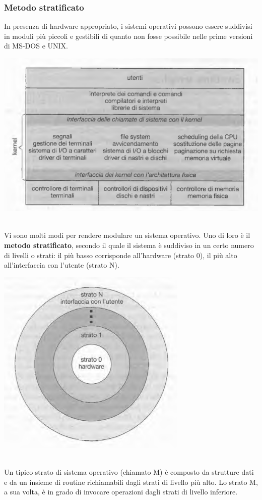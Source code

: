 \documentclass[11pt,a4paper]{article}
\begin{document}
\subsubsection{Metodo stratificato}
In presenza di hardware appropriato, i sistemi operativi possono essere suddivisi in moduli
più piccoli e gestibili di quanto non fosse possibile nelle prime versioni di MS-DOS e UNIX.\medskip\\
\begin{center}
  \includegraphics[scale=0.65]{img/0003.png}
\end{center}\medskip\\
Vi sono molti modi per rendere modulare un sistema operativo. Uno di loro è il \textbf{metodo stratificato}, secondo il quale il sistema è suddiviso in un certo numero di livelli o stra­ti: il più basso corrisponde all'hardware (strato 0), il più alto all'interfaccia con l'utente
(strato N).\medskip\\
\begin{center}
  \includegraphics[scale=0.65]{img/0004.png}
\end{center}\medskip\\
Un tipico strato di sistema operativo (chiamato M) è
composto da strutture dati e da un insieme di routine richiamabili dagli strati di livello più alto.
Lo strato M, a sua volta, è in grado di invocare operazioni dagli strati di livello inferiore.
\end{document}
